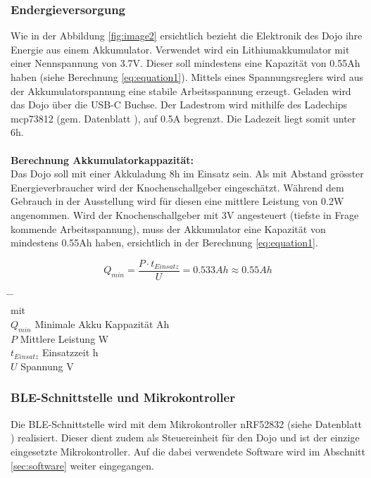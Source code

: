 \documentclass[10pt,a4paper,oneside]{99_fhnwreport}
\begin{document}
\subsubsection{Endergieversorgung}
Wie in der Abbildung \ref{fig:image2} ersichtlich bezieht die Elektronik des Dojo ihre Energie aus einem Akkumulator. Verwendet wird ein Lithiumakkumulator mit einer Nennspannung von 3.7V. Dieser soll mindestens eine Kapazität von 0.55Ah haben (siehe Berechnung \ref{eq:equation1}). Mittels eines Spannungsreglers wird aus der Akkumulatorspannung eine stabile Arbeitsspannung erzeugt. Geladen wird das Dojo über die USB-C Buchse. Der Ladestrom wird mithilfe des Ladechips mcp73812 (gem. Datenblatt \cite{MCP73811}), auf 0.5A begrenzt. Die Ladezeit liegt somit unter 6h.\\
\\
\textbf{Berechnung Akkumulatorkappazität:}\\
Das Dojo soll mit einer Akkuladung 8h im Einsatz sein. Als mit Abstand grösster Energieverbraucher wird der Knochenschallgeber eingeschätzt. Während dem Gebrauch in der Ausstellung wird für diesen eine mittlere Leistung von 0.2W angenommen. Wird der Knochenschallgeber mit 3V angesteuert (tiefste in Frage kommende Arbeitsspannung), muss der Akkumulator eine Kapazität von mindestens 0.55Ah haben, ersichtlich in der Berechnung \ref{eq:equation1}.

\begin{equation}
Q_{min} = \frac{P \cdot t_{Einsatz}}{U} = 0.533Ah \approx 0.55Ah
\label{eq:equation1}
\end{equation}
\begin{tabbing}
\hspace{20mm}	\=  \hspace{60mm} \= \hspace{30mm}	\= 	\\
mit	\\
$Q_{min}$	\> Minimale Akku Kappazität	 Ah	\>	\\
$P$		\> Mittlere Leistung		 W \>	\\
$t_{Einsatz}$	\> Einsatzzeit			 h	\\
$U$		\> Spannung			 V	\\
\end{tabbing}

\subsubsection{BLE-Schnittstelle und Mikrokontroller}
Die BLE-Schnittstelle wird mit dem Mikrokontroller nRF52832 (siehe Datenblatt \cite{NRF52832}) realisiert. Dieser dient zudem als Steuereinheit für den Dojo und ist der einzige eingesetzte Mikrokontroller. Auf die dabei verwendete Software wird im Abschnitt \ref{sec:software} weiter eingegangen.
\end{document}
